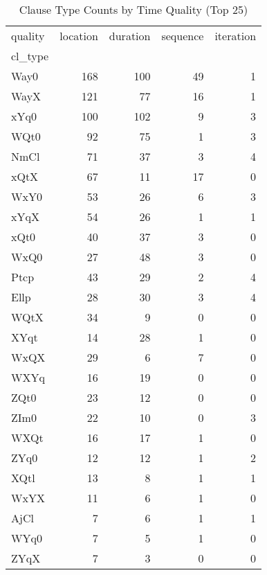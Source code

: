 \begin{table}[htbp!]
\centering
\caption{Clause Type Counts by Time Quality (Top 25)}
\label{table:type_ct}
\begin{tabular}{lrrrr}
\toprule
quality &  location &  duration &  sequence &  iteration \\
cl\_type &           &           &           &            \\
\midrule
Way0    &       168 &       100 &        49 &          1 \\
WayX    &       121 &        77 &        16 &          1 \\
xYq0    &       100 &       102 &         9 &          3 \\
WQt0    &        92 &        75 &         1 &          3 \\
NmCl    &        71 &        37 &         3 &          4 \\
xQtX    &        67 &        11 &        17 &          0 \\
WxY0    &        53 &        26 &         6 &          3 \\
xYqX    &        54 &        26 &         1 &          1 \\
xQt0    &        40 &        37 &         3 &          0 \\
WxQ0    &        27 &        48 &         3 &          0 \\
Ptcp    &        43 &        29 &         2 &          4 \\
Ellp    &        28 &        30 &         3 &          4 \\
WQtX    &        34 &         9 &         0 &          0 \\
XYqt    &        14 &        28 &         1 &          0 \\
WxQX    &        29 &         6 &         7 &          0 \\
WXYq    &        16 &        19 &         0 &          0 \\
ZQt0    &        23 &        12 &         0 &          0 \\
ZIm0    &        22 &        10 &         0 &          3 \\
WXQt    &        16 &        17 &         1 &          0 \\
ZYq0    &        12 &        12 &         1 &          2 \\
XQtl    &        13 &         8 &         1 &          1 \\
WxYX    &        11 &         6 &         1 &          0 \\
AjCl    &         7 &         6 &         1 &          1 \\
WYq0    &         7 &         5 &         1 &          0 \\
ZYqX    &         7 &         3 &         0 &          0 \\
\bottomrule
\end{tabular}
\end{table}
